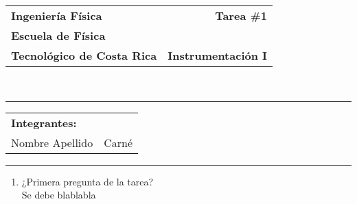 \documentclass[12pt]{article}
\begin{document}
\noindent
\begin{tabularx}{\linewidth}{Xr}
\textbf{Ingeniería Física}& \textbf{Tarea \#1} \\
\textbf{Escuela de Física}& \\
\textbf{Tecnológico de Costa Rica}& \textbf{Instrumentación I} \\
\end{tabularx}\\

\noindent\rule[2ex]{\textwidth}{2pt}
\begin{tabularx}{\linewidth}{Xr}
\textbf{Integrantes:} & \\
Nombre Apellido & Carné
\end{tabularx}

\noindent\rule[2ex]{\textwidth}{2pt}

\begin{enumerate}
\item ¿Primera pregunta de la tarea?\\
Se debe blablabla

\end{enumerate}
\end{document}
